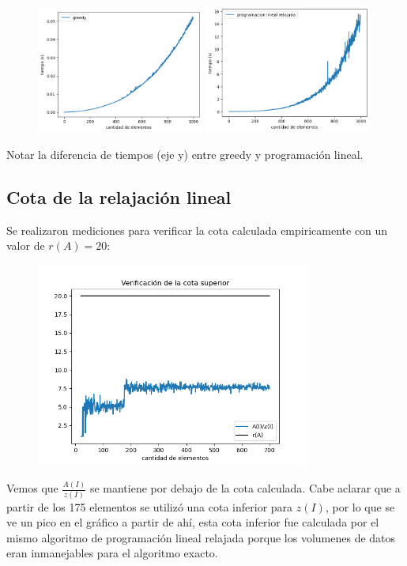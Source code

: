 \begin{figure}[H]
    \centering
    \includegraphics[width=0.49\textwidth]{img/greedy.png}
    \includegraphics[width=0.49\textwidth]{img/pl_rlx.png}
\end{figure}

Notar la diferencia de tiempos (eje y) entre greedy y programación lineal.

\subsection{Cota de la relajación lineal}

Se realizaron mediciones para verificar la cota calculada empiricamente con un
valor de $r(A) = 20$:

\begin{figure}[H]
    \centering
    \includegraphics[width=0.8\textwidth]{img/cota.png}
\end{figure}

Vemos que $\frac{A(I)}{z(I)}$ se mantiene por debajo de la cota calculada. Cabe
aclarar que a partir de los 175 elementos se utilizó una cota inferior para
$z(I)$, por lo que se ve un pico en el gráfico a partir de ahí, esta cota
inferior fue calculada por el mismo algoritmo de programación lineal relajada
porque los volumenes de datos eran inmanejables para el algoritmo exacto.
